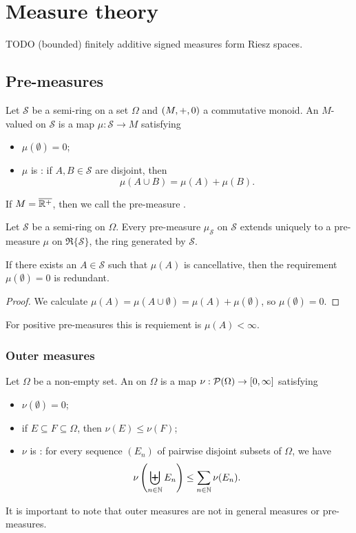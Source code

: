 \chapter{Measure theory}
TODO (bounded) finitely additive signed measures form Riesz spaces.
\section{Pre-measures}
\begin{definition}
Let $\mathcal{S}$ be a semi-ring on a set $\Omega$ and $\left( M,+,0 \right)$ a commutative monoid. An $M$-valued  on $\mathcal{S}$ is a map $\mu: \mathcal{S} \to M$ satisfying
\begin{itemize}
\item $\mu(\emptyset) = 0$;
\item $\mu$ is : if $A,B \in \mathcal{S}$ are disjoint, then
\[ \mu(A\cup B) = \mu(A)+\mu(B). \]
\end{itemize}
If $M = \overline{\mathbb{R}^+}$, then we call the pre-measure .
\end{definition}
\begin{proposition}
Let $\mathcal{S}$ be a semi-ring on $\Omega$. Every pre-measure $\mu_\mathcal{S}$ on $\mathcal{S}$ extends uniquely to a pre-measure $\mu$ on $\mathfrak{R}\{\mathcal{S}\}$, the ring generated by $\mathcal{S}$.
\end{proposition}

\begin{lemma} \label{emptysetNullset}
If there exists an $A\in \mathcal{S}$ such that $\mu(A)$ is cancellative, then the requirement $\mu(\emptyset) = 0$ is redundant.
\end{lemma}
\begin{proof}
We calculate $\mu(A) = \mu(A \cup \emptyset) = \mu(A) + \mu(\emptyset)$, so $\mu(\emptyset) = 0$.
\end{proof}
For positive pre-measures this is requiement is $\mu(A) < \infty$.


\subsection{Outer measures}
\begin{definition}
Let $\Omega$ be a non-empty set. An  on $\Omega$ is a map $\nu: \operatorname{\mathcal{P}}(\Omega)\to [0,\infty]$ satisfying
\begin{itemize}
\item $\nu(\emptyset) = 0$;
\item if $E\subseteq F\subseteq \Omega$, then $\nu(E)\leq \nu(F)$;
\item $\nu$ is : for every sequence $(E_n)$ of pairwise disjoint subsets of $\Omega$, we have
\[ \nu\left(\biguplus_{n\in\mathbb{N}}E_n\right) \leq \sum_{n\in\mathbb{N}}\nu(E_n). \]
\end{itemize}
\end{definition}
It is important to note that outer measures are not in general measures or pre-measures.



